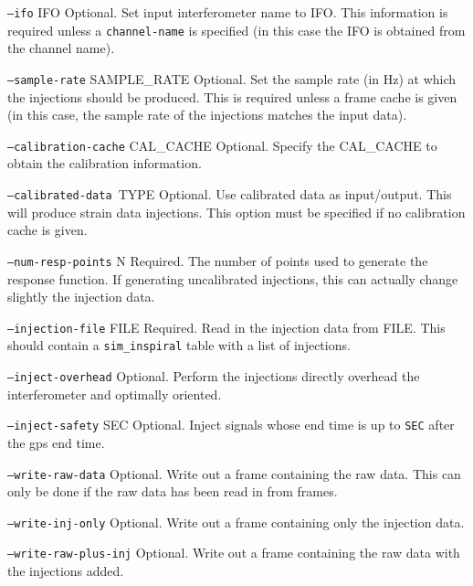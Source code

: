 \begin{entry}
\begin{entry}
\item[\texttt{--ifo} \textsc{IFO}] Optional.  Set input interferometer
name to \textsc{IFO}.  This information is required unless a
\texttt{channel-name} is specified (in this case the \textsc{IFO} is
obtained from the channel name).

\item[\texttt{--sample-rate} \textsc{SAMPLE\_RATE}] Optional.  Set the
sample rate (in Hz) at which the injections should be produced.  This is
required unless a frame cache is given (in this case, the sample rate of
the injections matches the input data).


\item[\texttt{--calibration-cache} \textsc{CAL\_CACHE}] Optional.
Specify the \textsc{CAL\_CACHE} to obtain the calibration information.

\item[\texttt{--calibrated-data }\textsc{TYPE}]  Optional.  Use
calibrated data as input/output.  This will produce strain data
injections.  This option must be specified if no calibration cache is
given.  
  
\item[\texttt{--num-resp-points} \textsc{N}] Required.  The number of
points used to generate the response function.  If generating
uncalibrated injections, this can actually change slightly the injection
data.   
 
\item[\texttt{--injection-file} \textsc{FILE}] Required. Read in the
injection data from \textsc{FILE}.  This should contain a
\texttt{sim\_inspiral} table with a list of injections.

\item[\texttt{--inject-overhead}] Optional.  Perform the injections
directly overhead the interferometer and optimally oriented.

\item[\texttt{--inject-safety} \textsc{SEC}] Optional.  Inject signals
whose end time is up to \texttt{SEC} after the gps end time.
 
\item[\texttt{--write-raw-data}]  Optional.  Write out a frame
containing the raw data.  This can only be done if the raw data has been
read in from frames.

\item[\texttt{--write-inj-only}]  Optional.  Write out a frame
containing only the injection data.

\item[\texttt{--write-raw-plus-inj}]  Optional.  Write out a frame
containing the raw data with the injections added.
  

\end{entry}
\end{entry}
